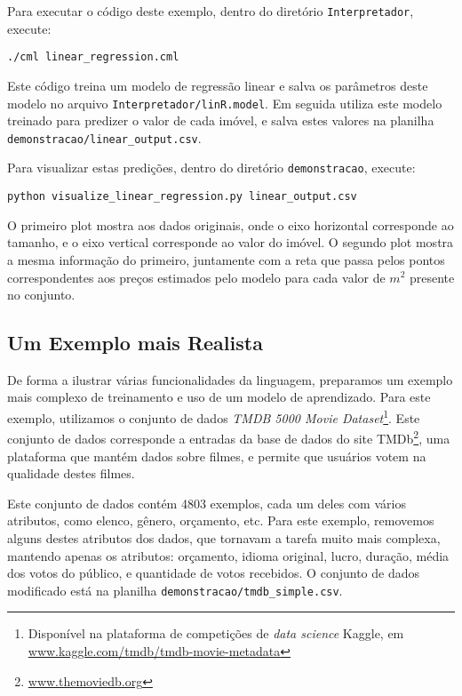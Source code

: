 \documentclass[12pt]{article}
\begin{document}
Para executar o código deste exemplo, dentro do diretório \texttt{Interpretador}, execute:

\begin{verbatim}
./cml linear_regression.cml
\end{verbatim}

Este código treina um modelo de regressão linear e salva os parâmetros deste modelo no arquivo \texttt{Interpretador/linR.model}. Em seguida utiliza este modelo treinado para predizer o valor de cada imóvel, e salva estes valores na planilha \texttt{demonstracao/linear\_output.csv}.

Para visualizar estas predições, dentro do diretório \texttt{demonstracao}, execute:

\begin{verbatim}
python visualize_linear_regression.py linear_output.csv
\end{verbatim}

O primeiro plot mostra aos dados originais, onde o eixo horizontal corresponde ao tamanho, e o eixo vertical corresponde ao valor do imóvel. O segundo plot mostra a mesma informação do primeiro, juntamente com a reta que passa pelos pontos correspondentes aos preços estimados pelo modelo para cada valor de $m^2$ presente no conjunto.

\subsection{Um Exemplo mais Realista}

De forma a ilustrar várias funcionalidades da linguagem, preparamos um exemplo mais complexo de treinamento e uso de um modelo de aprendizado. Para este exemplo, utilizamos o conjunto de dados \textit{TMDB 5000 Movie Dataset}\footnote{Disponível na plataforma de competições de \textit{data science} Kaggle, em \url{www.kaggle.com/tmdb/tmdb-movie-metadata}}. Este conjunto de dados corresponde a entradas da base de dados do site TMDb\footnote{\url{www.themoviedb.org}}, uma plataforma que mantém dados sobre filmes, e permite que usuários votem na qualidade destes filmes. 

Este conjunto de dados contém 4803 exemplos, cada um deles com vários atributos, como elenco, gênero, orçamento, etc. Para este exemplo, removemos alguns destes atributos dos dados, que tornavam a tarefa muito mais complexa, mantendo apenas os atributos: orçamento, idioma original, lucro, duração, média dos votos do público, e quantidade de votos recebidos. O conjunto de dados modificado está na planilha \texttt{demonstracao/tmdb\_simple.csv}. 
\end{document}
